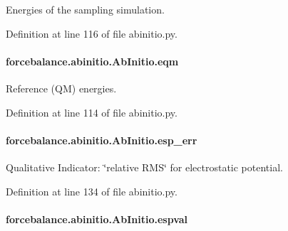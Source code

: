 Energies of the sampling simulation. 



Definition at line 116 of file abinitio.\-py.

\hypertarget{classforcebalance_1_1abinitio_1_1AbInitio_a64387fae9bdfb0d03ca6961e67c779be}{
\paragraph[{eqm}]{\setlength{\rightskip}{0pt plus 5cm}forcebalance.\-abinitio.\-Ab\-Initio.\-eqm\hspace{0.3cm}{\ttfamily [inherited]}}}\label{classforcebalance_1_1abinitio_1_1AbInitio_a64387fae9bdfb0d03ca6961e67c779be}


Reference (Q\-M) energies. 



Definition at line 114 of file abinitio.\-py.

\hypertarget{classforcebalance_1_1abinitio_1_1AbInitio_abdc625c3149cee375b56b4e0d73034fe}{
\paragraph[{esp\-\_\-err}]{\setlength{\rightskip}{0pt plus 5cm}forcebalance.\-abinitio.\-Ab\-Initio.\-esp\-\_\-err\hspace{0.3cm}{\ttfamily [inherited]}}}\label{classforcebalance_1_1abinitio_1_1AbInitio_abdc625c3149cee375b56b4e0d73034fe}


Qualitative Indicator\-: \char`\"{}relative R\-M\-S\char`\"{} for electrostatic potential. 



Definition at line 134 of file abinitio.\-py.

\hypertarget{classforcebalance_1_1abinitio_1_1AbInitio_aba6d885086d455fce8c3d472fd08020d}{
\paragraph[{espval}]{\setlength{\rightskip}{0pt plus 5cm}forcebalance.\-abinitio.\-Ab\-Initio.\-espval\hspace{0.3cm}{\ttfamily [inherited]}}}\label{classforcebalance_1_1abinitio_1_1AbInitio_aba6d885086d455fce8c3d472fd08020d}


